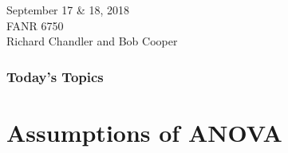 \documentclass[color=usenames,dvipsnames]{beamer}\usepackage[]{graphicx}\usepackage[]{color}
\begin{document}

\begin{frame}[plain]
  \LARGE
  \centering \par
  {\bf \color{RoyalBlue}{Lab 5 -- Assumptions of ANOVA}} \par
  \vspace{1cm}
  \Large
  September 17 \& 18, 2018 \\
  FANR 6750 \\
  \vfill
  \large
  Richard Chandler and Bob Cooper
\end{frame}





\begin{frame}[plain]
  \frametitle{Today's Topics}
  \Large
\end{frame}






\section{Assumptions of ANOVA}












\end{document}
